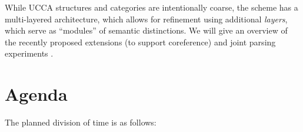 \documentclass[11pt,a4paper,table]{article}
\begin{document}
While UCCA structures and categories are intentionally coarse, the scheme has a multi-layered architecture, which allows for refinement using additional {\it layers}, which serve as ``modules'' of semantic distinctions.
We will give an overview of the recently proposed extensions
(to support coreference) and joint parsing experiments \citep{prange2019made,prange2019semantically}.


\section{Agenda}\label{sec:agenda}

The planned division of time is as follows:
\end{document}
